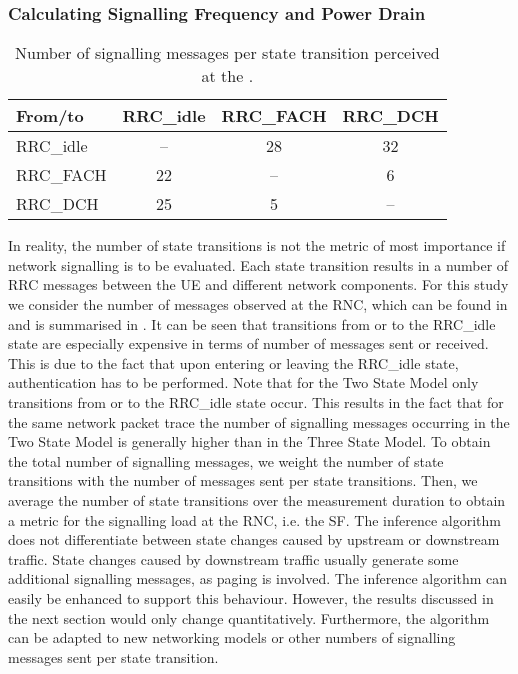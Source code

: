\subsubsection*{Calculating Signalling Frequency and Power Drain}\label{sec:network:network_traces:calculating_metrics}

\begin{table}
\centering
  \caption{Number of signalling messages per  state transition perceived at the  \cite{3GPP_RRC_Spec}.}
  \label{tab:network:network_traces:calculating_metrics:signalling_messages}
\begin{tabular}{lccc}
	\toprule
    From/to & \gls{RRC_idle} & \gls{RRC_FACH} & \gls{RRC_DCH}\\
    \midrule
    \gls{RRC_idle} & -- & 28 & 32\\
    \gls{RRC_FACH} & 22 & -- & 6\\
    \gls{RRC_DCH} & 25 & 5 & --\\
    \bottomrule
	\end{tabular}
\end{table}

In reality, the number of state transitions is not the metric of most importance if network signalling is to be evaluated.
Each state transition results in a number of \gls{RRC} messages between the \gls{UE} and different network components.
For this study we consider the number of messages observed at the \gls{RNC}, which can be found in \cite{3GPP_RRC_Spec} and is summarised in .
It can be seen that transitions from or to the \gls{RRC_idle} state are especially expensive in terms of number of messages sent or received.
This is due to the fact that upon entering or leaving the \gls{RRC_idle} state, authentication has to be performed.
Note that for the Two State Model only transitions from or to the \gls{RRC_idle} state occur.
This results in the fact that for the same network packet trace the number of signalling messages occurring in the Two State Model is generally higher than in the Three State Model.
To obtain the total number of signalling messages, we weight the number of state transitions with the number of messages sent per state transitions.
Then, we average the number of state transitions over the measurement duration to obtain a metric for the signalling load at the \gls{RNC}, i.e. the \gls{SF}.
The inference algorithm does not differentiate between state changes caused by upstream or downstream traffic.
State changes caused by downstream traffic usually generate some additional signalling messages, as paging is involved.
The inference algorithm can easily be enhanced to support this behaviour.
However, the results discussed in the next section would only change quantitatively.
Furthermore, the algorithm can be adapted to new networking models or other numbers of signalling messages sent per state transition.

